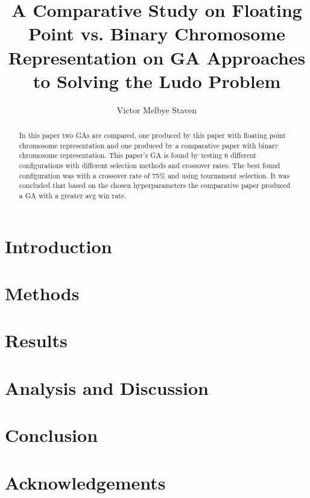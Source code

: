 \documentclass{llncs}
\begin{document}
\title{A Comparative Study on Floating Point vs. Binary Chromosome Representation
on GA Approaches to Solving the Ludo Problem }
\author{Victor Melbye Staven}
\maketitle

\begin{abstract}
In this paper two GAs are compared, one produced by this paper with floating point chromosome representation 
and one produced by a comparative paper with binary chromosome representation.
This paper's GA is found by testing 6 different configurations with different selection methods 
and crossover rates. The best found configuration was with a crossover rate of 75\% and using tournament selection. 
It was concluded that based on the chosen hyperparameters the comparative
paper produced a GA with a greater avg win rate.
\end{abstract}

\section{Introduction}
\label{sec:Introduction}

\newpage
\section{Methods}
\label{sec:Methods}


\section{Results}
\label{sec:Results}


\section{Analysis and Discussion}
\label{sec:Analysis and Discussion}


\section{Conclusion}
\label{sec:Conclusion}


\section{Acknowledgements}
\label{sec:Acknowledgements}


\printbibliography %
\end{document}
